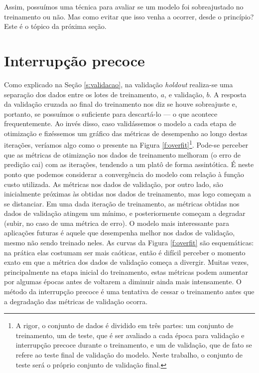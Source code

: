       Assim, possuímos uma técnica para avaliar se um modelo foi sobreajustado no treinamento ou não. Mas como evitar que isso venha a ocorrer, desde o princípio? Este é o tópico da próxima seção.


  \section{Interrupção precoce} \label{s:interrupcao_precoce}

    Como explicado na Seção \ref{s:validacao}, na validação \textit{holdout} realiza-se uma separação dos dados entre os lotes de treinamento, $a$, e validação, $b$. A resposta da validação cruzada ao final do treinamento nos diz se houve sobreajuste e, portanto, se possuímos o suficiente para descartá-lo --- o que acontece frequentemente. Ao invés disso, caso validássemos o modelo a cada etapa de otimização e fizéssemos um gráfico das métricas de desempenho ao longo destas iterações, veríamos algo como o presente na Figura \ref{f:overfit}\footnote{A rigor, o conjunto de dados é dividido em três partes: um conjunto de treinamento, um de teste, que é ser avaliado a cada época para validação e interrupção precoce durante o treinamento, e um de validação, que de fato se refere ao teste final de validação do modelo. Neste trabalho, o conjunto de teste será o próprio conjunto de validação final.}.
    Pode-se perceber que as métricas de otimização nos dados de treinamento melhoram (o erro de predição cai) com as iterações, tendendo a um platô de forma assintótica. É neste ponto que podemos considerar a convergência do modelo com relação à função custo utilizada. As métricas nos dados de validação, por outro lado, são inicialmente próximas às obtidas nos dados de treinamento, mas logo começam a se distanciar. Em uma dada iteração de treinamento, as métricas obtidas nos dados de validação atingem um mínimo, e posteriormente começam a degradar (subir, no caso de uma métrica de erro). O modelo mais interessante para aplicações futuras é aquele que desempenha melhor nos dados de validação, mesmo não sendo treinado neles. As curvas da Figura \ref{f:overfit} são esquemáticas: na prática elas costumam ser mais caóticas, então é difícil perceber o momento exato em que a métrica dos dados de validação começa a divergir. Muitas vezes, principalmente na etapa inicial do treinamento, estas métricas podem aumentar por algumas épocas antes de voltarem a diminuir ainda mais intensamente. O método da interrupção precoce é uma tentativa de cessar o treinamento antes que a degradação das métricas de validação ocorra.

